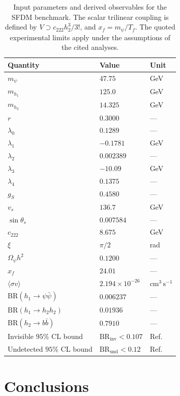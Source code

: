 \documentclass[superscriptaddress,
showpacs,preprintnumbers,nofootinbib,eqsecnum,amsmath,amssymb,aps,11pt, groupedaddress, floatfix]{revtex4-2}
\begin{document}
\begin{table}[h]
 \centering
 \small
 \begin{tabular}{lll}
 \hline
 Quantity & Value & Unit \\
 \hline
 $m_\psi$ & $47.75$ & GeV \\
 $m_{h_1}$ & $125.0$ & GeV \\
 $m_{h_2}$ & $14.325$ & GeV \\
 $r$ & $0.3000$ & --- \\
 $\lambda_0$ & $0.1289$ & --- \\
 $\lambda_1$ & $-0.1781$ & GeV \\
 $\lambda_2$ & $0.002389$ & --- \\
 $\lambda_3$ & $-10.09$ & GeV \\
 $\lambda_4$ & $0.1375$ & --- \\
 $g_S$ & $0.4580$ & --- \\
 $v_s$ & $136.7$ & GeV \\
 $\sin\theta_s$ & $0.007584$ & --- \\
 $c_{222}$ & $8.675$ & GeV \\
 $\xi$ & $\pi/2$ & rad \\
 $\Omega_\psi h^2$ & $0.1200$ & --- \\
 $x_f$ & $24.01$ & --- \\
 $\langle\sigma v\rangle$ & $2.194\times10^{-26}$ & $\mathrm{cm^3\,s^{-1}}$ \\
 $\mathrm{BR}(h_1\to\psi\bar\psi)$ & $0.006237$ & --- \\
 $\mathrm{BR}(h_1\to h_2h_2)$ & $0.01936$ & --- \\
 $\mathrm{BR}(h_2\to b\bar b)$ & $0.7910$ & --- \\
 Invisible $95\%$ CL bound & $\mathrm{BR}_{\mathrm{inv}}<0.107$ & Ref.~\cite{ATLAS:2023tkt} \\
 Undetected $95\%$ CL bound & $\mathrm{BR}_{\mathrm{und}}<0.12$ & Ref.~\cite{ATLAS:2022vkf} \\
 \hline
 \end{tabular}
 \caption{\justifying
Input parameters and derived observables for the SFDM benchmark.
The scalar trilinear coupling is defined by $V\supset c_{222}h_2^3/3!$, and
$x_f=m_\psi/T_f$.
The quoted experimental limits apply under the assumptions of the cited analyses.
 }
 \label{tab:sfdm-r03-benchmark-paper}
\end{table}


\section{Conclusions}
\label{sec:conclusions}
\end{document}
